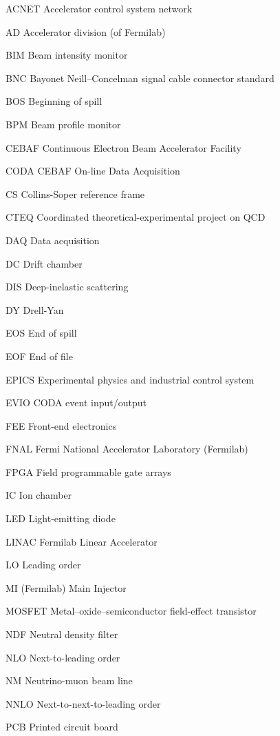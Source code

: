 \documentclass[edeposit,fullpage]{uiucthesis2009}
\begin{document}
\begin{symbollist*}
	\item[ACNET] Accelerator control system network
	\item[AD] Accelerator division (of Fermilab)
	\item[BIM] Beam intensity monitor
	\item[BNC] Bayonet Neill–Concelman signal cable connector standard
	\item[BOS] Beginning of spill
	\item[BPM] Beam profile monitor
	\item[CEBAF] Continuous Electron Beam Accelerator Facility
	\item[CODA] CEBAF On-line Data Acquisition
	\item[CS] Collins-Soper reference frame
	\item[CTEQ] Coordinated theoretical-experimental project on QCD
	\item[DAQ] Data acquisition
	\item[DC] Drift chamber
	\item[DIS] Deep-inelastic scattering
	\item[DY] Drell-Yan
	\item[EOS] End of spill
	\item[EOF] End of file
	\item[EPICS] Experimental physics and industrial control system
	\item[EVIO] CODA event input/output
	\item[FEE] Front-end electronics
	\item[FNAL] Fermi National Accelerator Laboratory (Fermilab)
	\item[FPGA] Field programmable gate arrays
	\item[IC] Ion chamber
	\item[LED] Light-emitting diode
	\item[LINAC] Fermilab Linear Accelerator
	\item[LO] Leading order
	\item[MI] (Fermilab) Main Injector
	\item[MOSFET] Metal–oxide–semiconductor field-effect transistor
	\item[NDF] Neutral density filter
	\item[NLO] Next-to-leading order
	\item[NM] Neutrino-muon beam line
	\item[NNLO] Next-to-next-to-leading order
	\item[PCB] Printed circuit board

\end{symbollist*}
\end{document}
